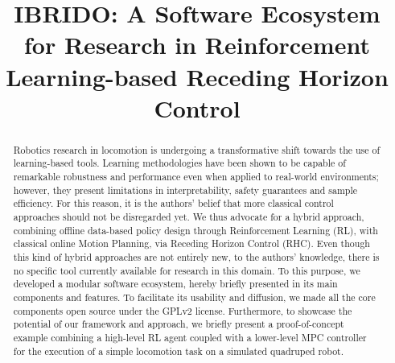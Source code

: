 \documentclass[letterpaper, 10 pt, conference]{ieeeconf}  %
\begin{document}
	
\title{\LARGE \bf
IBRIDO: A Software Ecosystem for Research in Reinforcement Learning-based Receding Horizon Control
}

\author{
}

\maketitle

\begingroup\renewcommand{}
\endgroup

\begingroup\renewcommand{}
\endgroup

\begingroup\renewcommand{}
\endgroup

\setlength{\textfloatsep}{12.0pt plus 8.0pt minus .0pt}

\begin{abstract}
Robotics research in locomotion is undergoing a transformative shift towards the use of learning-based tools. Learning methodologies have been shown to be capable of remarkable robustness and performance even when applied to real-world environments; however, they present limitations in interpretability, safety guarantees and sample efficiency. For this reason, it is the authors' belief that more classical control approaches should not be disregarded yet. We thus advocate for a hybrid approach, combining offline data-based policy design through Reinforcement Learning (RL), with classical online Motion Planning, via Receding Horizon Control (RHC). Even though this kind of hybrid approaches are not entirely new, to the authors' knowledge, there is no specific tool currently available for research in this domain. To this purpose, we developed a modular software ecosystem, hereby briefly presented in its main components and features. 
To facilitate its usability and diffusion, we made all the core components open source under the GPLv2 license. Furthermore, to showcase the potential of our framework and approach, we briefly present a proof-of-concept example combining a high-level RL agent coupled with a lower-level MPC controller for the execution of a simple locomotion task on a simulated quadruped robot.
\end{abstract}

\IEEEpeerreviewmaketitle


%
%






\end{document}
